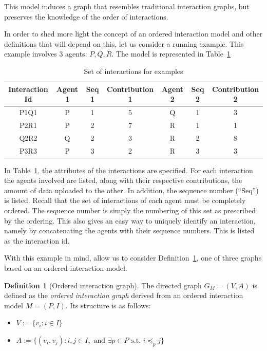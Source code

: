 \documentclass[a4paper,11pt]{book}
\theoremstyle{definition}
\newtheorem{definition}{Definition}
\begin{document}
This model induces a graph that resembles traditional interaction graphs, but preserves the knowledge
of the order of interactions.


In order to shed more light the concept of an ordered interaction model and other
definitions that will depend on this, let us consider a running example. This example involves
3 agents: $P, Q, R$. The model is represented in Table~\ref{tab:interactions}

\begin{table}[h]
    \centering
    \begin{tabular}{c|c|c|c|c|c|c}
        Interaction Id & Agent 1 & Seq 1 & Contribution 1 & Agent 2 & Seq 2 & Contribution 2 \\\hline
        P1Q1           & P       & 1                 & 5            & Q       & 1                 & 3            \\
        P2R1           & P       & 2                 & 7            & R       & 1                 & 1            \\
        Q2R2           & Q       & 2                 & 3            & R       & 2                 & 8            \\
        P3R3           & P       & 3                 & 2            & R       & 3                 & 3            \\
    \end{tabular}
    \caption{Set of interactions for examples}
    \label{tab:interactions}
\end{table}

In Table~\ref{tab:interactions}, the attributes of the interactions are specified. For each interaction the
agents involved are listed, along with their respective contributions, the amount of data uploaded
to the other. In addition, the sequence number (``Seq'') is listed. Recall that the set of interactions of each agent must
be completely ordered. The sequence number is
simply the numbering of this set as prescribed by the ordering. This also gives an easy way to uniquely
identify an interaction, namely by concatenating the agents with their sequence numbers. This is listed
as the interaction id.

With this example in mind, allow us to consider Definition~\ref{def:oig}, one of three graphs based on 
an ordered interaction model.

\begin{definition}[Ordered interaction graph]
    The directed graph $G_M = (V, A)$ is defined as the \emph{ordered interaction graph} derived from an ordered interaction model $M = (P,I)$.
    Its structure is as follows:
    \begin{itemize}
        \item $V := \{ v_{i} : i \in I\}$\\
        \item $A := \{ (v_{i}, v_{j}) : i, j \in I, \mbox{ and } \exists p\in P \mbox{ s.t. } i \preceq_p j \}$\\
    \end{itemize}
    \label{def:oig}
\end{definition}
\end{document}
